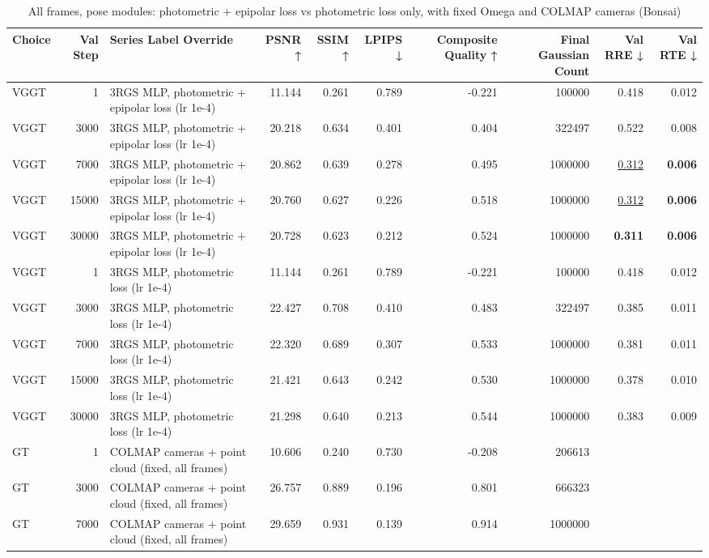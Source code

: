 \begin{table}[H]
\caption{\ifdefined\customcaption \customcaption \else All frames, pose modules: photometric + epipolar loss vs photometric loss only, with fixed Omega and COLMAP cameras (Bonsai) \fi}
\label{tab:117_omega_epi_all_modules_bonsai}
\centering
\tiny
\begin{tabular}{lrlrrrrrrr}
\toprule
Choice & Val Step & Series Label Override & PSNR ↑ & SSIM ↑ & LPIPS ↓ & Composite Quality ↑ & Final Gaussian Count & Val RRE ↓ & Val RTE ↓ \\
\midrule
VGGT & 1 & 3RGS MLP, photometric + epipolar loss (lr 1e-4) & 11.144 & 0.261 & 0.789 & -0.221 & 100000 & 0.418 & 0.012 \\
VGGT & 3000 & 3RGS MLP, photometric + epipolar loss (lr 1e-4) & 20.218 & 0.634 & 0.401 & 0.404 & 322497 & 0.522 & 0.008 \\
VGGT & 7000 & 3RGS MLP, photometric + epipolar loss (lr 1e-4) & 20.862 & 0.639 & 0.278 & 0.495 & 1000000 & \underline{0.312} & \textbf{0.006} \\
VGGT & 15000 & 3RGS MLP, photometric + epipolar loss (lr 1e-4) & 20.760 & 0.627 & 0.226 & 0.518 & 1000000 & \underline{0.312} & \textbf{0.006} \\
VGGT & 30000 & 3RGS MLP, photometric + epipolar loss (lr 1e-4) & 20.728 & 0.623 & 0.212 & 0.524 & 1000000 & \textbf{0.311} & \textbf{0.006} \\
VGGT & 1 & 3RGS MLP, photometric loss (lr 1e-4) & 11.144 & 0.261 & 0.789 & -0.221 & 100000 & 0.418 & 0.012 \\
VGGT & 3000 & 3RGS MLP, photometric loss (lr 1e-4) & 22.427 & 0.708 & 0.410 & 0.483 & 322497 & 0.385 & 0.011 \\
VGGT & 7000 & 3RGS MLP, photometric loss (lr 1e-4) & 22.320 & 0.689 & 0.307 & 0.533 & 1000000 & 0.381 & 0.011 \\
VGGT & 15000 & 3RGS MLP, photometric loss (lr 1e-4) & 21.421 & 0.643 & 0.242 & 0.530 & 1000000 & 0.378 & 0.010 \\
VGGT & 30000 & 3RGS MLP, photometric loss (lr 1e-4) & 21.298 & 0.640 & 0.213 & 0.544 & 1000000 & 0.383 & 0.009 \\
GT & 1 & COLMAP cameras + point cloud (fixed, all frames) & 10.606 & 0.240 & 0.730 & -0.208 & 206613 &  &  \\
GT & 3000 & COLMAP cameras + point cloud (fixed, all frames) & 26.757 & 0.889 & 0.196 & 0.801 & 666323 &  &  \\
GT & 7000 & COLMAP cameras + point cloud (fixed, all frames) & 29.659 & 0.931 & 0.139 & 0.914 & 1000000 &  &  \\

\end{tabular}
\end{table}
